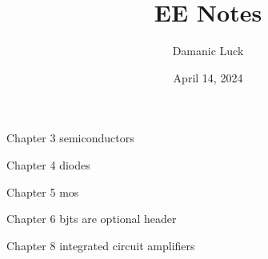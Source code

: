 \documentclass[10pt, openany]{book}
\title{EE Notes}
\author{Damanic Luck}
\date{April 14, 2024}
\begin{document}
\maketitle

\setcounter{chapter}{1}
\tableofcontents

\newpage
\begin{todo}
    \item Chapter 3 semiconductors
    \item Chapter 4 diodes
    \item Chapter 5 mos
    \item Chapter 6 bjts are optional header
    \item Chapter 8 integrated circuit amplifiers
\end{todo}


\newpage


\newpage

\end{document}
